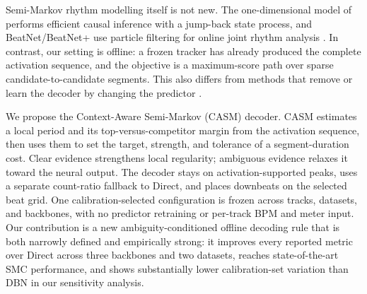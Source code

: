 \documentclass{article}
\begin{document}
Semi-Markov rhythm modelling itself is not new. The one-dimensional model of
\cite{heydari2022semimarkov} performs efficient causal inference with a
jump-back state process, and BeatNet/BeatNet+ use particle filtering for online
joint rhythm analysis \cite{heydari2021beatnet,heydari2024beatnetplus}. In
contrast, our setting is offline: a frozen tracker has already produced the
complete activation sequence, and the objective is a maximum-score path over
sparse candidate-to-candidate segments. This also differs from methods that
remove or learn the decoder by changing the predictor
\cite{chen2022postprocessingfree,foscarin2024beat,foscarin2026masked}.

We propose the Context-Aware Semi-Markov (CASM) decoder. CASM estimates a local
period and its top-versus-competitor margin from the activation sequence, then
uses them to set the target, strength, and tolerance of a segment-duration cost.
Clear evidence strengthens local regularity; ambiguous evidence relaxes it
toward the neural output. The decoder stays on activation-supported peaks, uses
a separate count-ratio fallback to Direct, and places downbeats on the selected
beat grid. One calibration-selected configuration is frozen across tracks,
datasets, and backbones, with no predictor retraining or per-track BPM and meter
input. Our contribution is a new ambiguity-conditioned offline decoding rule
that is both narrowly defined and empirically strong: it improves every
reported metric over Direct across three backbones and two datasets, reaches
state-of-the-art SMC performance, and shows substantially lower calibration-set
variation than DBN in our sensitivity analysis.
\end{document}
